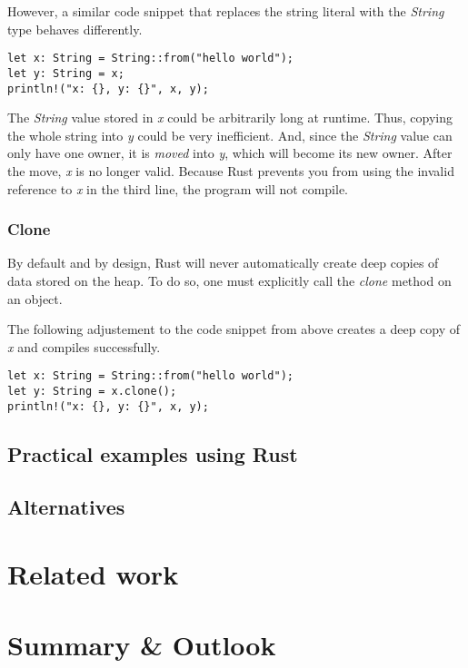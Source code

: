 \documentclass[sigplan,11pt,nonacm]{acmart}
\begin{document}
However, a similar code snippet that replaces the string literal with the \emph{String} type behaves differently.
\begin{lstlisting}
let x: String = String::from("hello world");
let y: String = x;
println!("x: {}, y: {}", x, y);
\end{lstlisting}
The \emph{String} value stored in \emph{x} could be arbitrarily long at runtime.
Thus, copying the whole string into \emph{y} could be very inefficient.
And, since the \emph{String} value can only have one owner, it is \emph{moved} into \emph{y}, which will become its new owner.
After the move, \emph{x} is no longer valid.
Because Rust prevents you from using the invalid reference to \emph{x} in the third line, the program will not compile.



\subsubsection{Clone}

By default and by design, Rust will never automatically create deep copies of data stored on the heap.
To do so, one must explicitly call the \emph{clone} method on an object.

The following adjustement to the code snippet from above creates a deep copy of \emph{x} and compiles successfully.
\begin{lstlisting}
let x: String = String::from("hello world");
let y: String = x.clone();
println!("x: {}, y: {}", x, y);
\end{lstlisting}

\cite{rust-book}


\subsection{Practical examples using Rust}


\subsection{Alternatives}


\section{Related work}
\label{sec:relatedwork}


\section{Summary \& Outlook}
\label{sec:summary}




\end{document}
